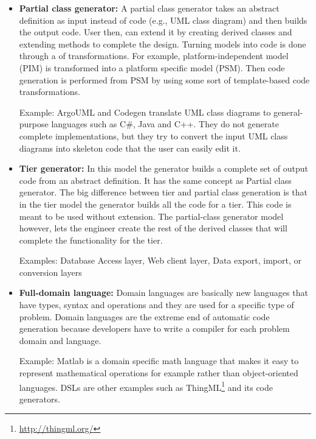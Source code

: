\begin{itemize}
\item \textbf{Partial class generator:} A partial class generator takes an abstract definition as input instead of code (e.g., UML class diagram) and then builds the output code. User then, can extend it by creating derived classes and extending methods to complete the design. Turning models into code is done through a  of transformations. For example, platform-independent model (PIM) is transformed into a platform specific model (PSM). Then code generation is performed from PSM by using some sort of template-based code transformations.

Example: ArgoUML and Codegen translate UML class diagrams to general-purpose languages such as C\#, Java and C++. They do not generate complete implementations, but they try to convert the input UML class diagrams into skeleton code that the user can easily edit it. 

\item \textbf{Tier generator:} In this model the generator builds a complete set of output code from an abstract definition. It has the same concept as Partial class generator. The big difference between tier and partial class generation is that in the tier model the generator builds all the code for a tier. This code is meant to be used without extension. The partial-class generator model however, lets the engineer create the rest of the derived classes that will complete the functionality for the tier.

Examples: Database Access layer, Web client layer, Data export, import, or conversion layers

\item \textbf{Full-domain language:} Domain languages are basically new languages that have types, syntax and operations and they are used for a specific type of problem. 
Domain languages are the extreme end of automatic code generation because developers have to write a compiler for each problem domain and language. 

Example: Matlab is a domain specific math language that makes it easy to represent mathematical operations for example rather than object-oriented languages. DSLs are other examples such as ThingML\footnote{\url{http://thingml.org/}} and its code generators.

\end{itemize}
